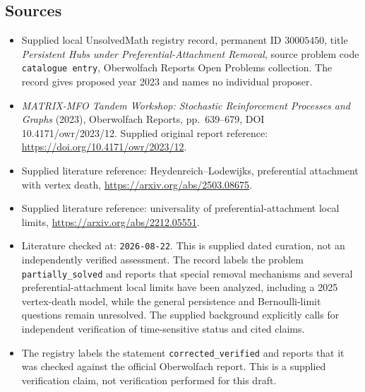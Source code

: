 \documentclass[11pt]{article}
\begin{document}
\subsection{Sources}
\begin{itemize}
\item Supplied local UnsolvedMath registry record, permanent ID \(30005450\), title \emph{Persistent Hubs under Preferential-Attachment Removal}, source problem code \texttt{catalogue entry}, Oberwolfach Reports Open Problems collection. The record gives proposed year 2023 and names no individual proposer.
\item \emph{MATRIX-MFO Tandem Workshop: Stochastic Reinforcement Processes and Graphs} (2023), Oberwolfach Reports, pp.~639--679, DOI 10.4171/owr/2023/12. Supplied original report reference: \url{https://doi.org/10.4171/owr/2023/12}.
\item Supplied literature reference: Heydenreich--Lodewijks, preferential attachment with vertex death, \url{https://arxiv.org/abs/2503.08675}.
\item Supplied literature reference: universality of preferential-attachment local limits, \url{https://arxiv.org/abs/2212.05551}.
\item Literature checked at: \texttt{2026-08-22}. This is supplied dated curation, not an independently verified assessment. The record labels the problem \texttt{partially\_solved} and reports that special removal mechanisms and several preferential-attachment local limits have been analyzed, including a 2025 vertex-death model, while the general persistence and Bernoulli-limit questions remain unresolved. The supplied background explicitly calls for independent verification of time-sensitive status and cited claims.
\item The registry labels the statement \texttt{corrected\_verified} and reports that it was checked against the official Oberwolfach report. This is a supplied verification claim, not verification performed for this draft.
\end{itemize}
\end{document}
